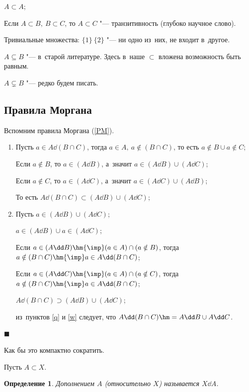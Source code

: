\documentclass[a4paper,10pt,twoside]{article}
\newtheorem{Def}{Определение}[section]
\newenvironment{Proof}
       {\par\noindent{\textbf{Доказательство.}}}
       {\hfill$\scriptstyle\blacksquare$}
\begin{document}
$A\subset A$;

Если $A\subset B,\ B\subset C$, то $A\subset C$ "--- транзитивность (глубоко научное слово).

Тривиальные множества: $\{1\}\ \{2\}$ "--- ни одно из~них, не входит в~другое.

$A\subseteq B$ "--- в~старой литературе. Здесь в~наше $\subset$ вложена возможность быть равным.

$A\varsubsetneq B$ "--- редко будем писать.
\subsection{Правила Моргана}
Вспомним правила Моргана (\ref{PM}).

\begin{Proof}
    \begin{enumerate}
        \item \label{q}Пусть $a \in A\dd(B\cap C)$, тогда $a\in A,\ a\notin(B\cap C)$, то есть $a\notin B \cup a\notin C$;

            Если $a\notin B$, то $a\in (A\dd B)$, а~значит $a\in(A\dd B) \cup (A\dd C)$;

            Если $a\notin C$, то $a\in(A\dd C)$, а~значит $a\in (A\dd C)\cup (A\dd B)$;

            То есть $A\dd (B\cap C)\subset (A\dd B)\cup (A\dd C)$;

        \item\label{w} Пусть $a\in (A\dd B)\cup (A\dd C)$;

        $a\in (A\dd B)\cup a\in (A\dd C)$;

        Если $a\in (A\dd B) \hm{\imp} (a\in A)\cap (a\notin B)$, тогда $a\notin (B\cap C) \hm{\imp} a\in A\dd(B\cap C)$;

        Если $a\in (A\dd C) \hm{\imp} (a\in A)\cap (a\notin C)$, тогда $a\notin (B\cap C) \hm{\imp} a\in A\dd(B\cap C)$;

        $A\dd (B\cap C)\supset (A\dd B)\cup (A\dd C)$;

        из~пунктов \ref{q} и \ref{w} следует, что  $A\dd(B\cap C)\hm=A\dd B\cup A\dd C$.

    \end{enumerate}
\end{Proof}

Как бы это компактно сократить.

Пусть $A\subset X$.
\begin{Def}
    Дополнением $A$ (относительно $X$) называется $X\dd A$.
\end{Def}
\end{document}
